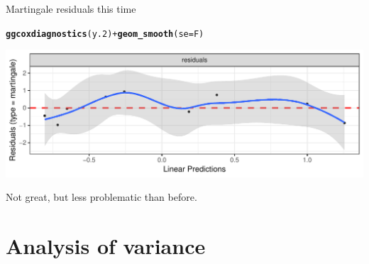 \documentclass[unknownkeysallowed]{beamer}\usepackage[]{graphicx}\usepackage[]{color}
\makeatletter
\def\maxwidth{ %
  \ifdim\Gin@nat@width>\linewidth
    \linewidth
  \else
    \Gin@nat@width
  \fi
}
\newcommand{\hlopt}[1]{\textcolor[rgb]{0,0,0}{#1}}%
\newcommand{\hlstd}[1]{\textcolor[rgb]{0.345,0.345,0.345}{#1}}%
\newcommand{\hlkwc}[1]{\textcolor[rgb]{0.333,0.667,0.333}{#1}}%
\newcommand{\hlkwd}[1]{\textcolor[rgb]{0.737,0.353,0.396}{\textbf{#1}}}%
\newenvironment{kframe}{%
 \def\at@end@of@kframe{}%
 \ifinner\ifhmode%
  \def\at@end@of@kframe{\end{minipage}}%
  \begin{minipage}{\columnwidth}%
 \fi\fi%
 \def\FrameCommand##1{\hskip\@totalleftmargin \hskip-\fboxsep
 \colorbox{shadecolor}{##1}\hskip-\fboxsep
     \hskip-\linewidth \hskip-\@totalleftmargin \hskip\columnwidth}%
 \MakeFramed {\advance\hsize-\width
   \@totalleftmargin\z@ \linewidth\hsize
   \@setminipage}}%
 {\par\unskip\endMakeFramed%
 \at@end@of@kframe}
\newenvironment{knitrout}{}{} %
\makeatother
\begin{document}
\begin{frame}[fragile]{Martingale residuals this time}
  
\begin{knitrout}
\color{fgcolor}\begin{kframe}
\begin{alltt}
\hlkwd{ggcoxdiagnostics}\hlstd{(y.2)}\hlopt{+}\hlkwd{geom_smooth}\hlstd{(}\hlkwc{se}\hlstd{=F)}
\end{alltt}


{\ttfamily\noindent\itshape{}}\end{kframe}
\includegraphics[width=\maxwidth]{figure/unnamed-chunk-153-1} 

\end{knitrout}

Not great, but less problematic than before.



\end{frame}




\section{Analysis of variance}
\frame{\sectionpage}
\end{document}
